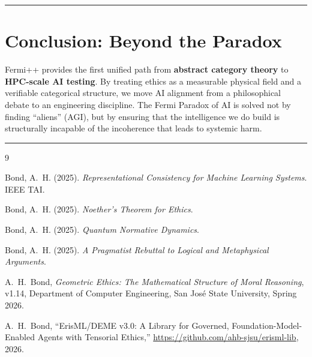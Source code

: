 \documentclass[12pt]{article}
\begin{document}
\bigskip
\hrule
\bigskip

\section{Conclusion: Beyond the Paradox}

Fermi++ provides the first unified path from \textbf{abstract category theory} to \textbf{HPC-scale AI testing}. By treating ethics as a measurable physical field and a verifiable categorical structure, we move AI alignment from a philosophical debate to an engineering discipline. The Fermi Paradox of AI is solved not by finding ``aliens'' (AGI), but by ensuring that the intelligence we do build is structurally incapable of the incoherence that leads to systemic harm.

\bigskip
\hrule
\bigskip

\begin{thebibliography}{9}

Bond, A.~H. (2025).
\textit{Representational Consistency for Machine Learning Systems}.
IEEE TAI.

Bond, A.~H. (2025).
\textit{Noether's Theorem for Ethics}.

Bond, A.~H. (2025).
\textit{Quantum Normative Dynamics}.

Bond, A.~H. (2025).
\textit{A Pragmatist Rebuttal to Logical and Metaphysical Arguments}.

A.~H.~Bond, \emph{Geometric Ethics: The Mathematical Structure of Moral Reasoning}, v1.14, Department of Computer Engineering, San Jos\'e State University, Spring 2026.

A.~H.~Bond, ``ErisML/DEME v3.0: A Library for Governed, Foundation-Model-Enabled Agents with Tensorial Ethics,'' \url{https://github.com/ahb-sjsu/erisml-lib}, 2026.

\end{thebibliography}
\end{document}
